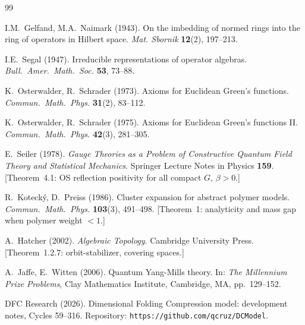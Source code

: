 \documentclass[11pt,a4paper]{article}
\begin{document}
\begin{thebibliography}{99}

I.M.~Gelfand, M.A.~Naimark (1943).
On the imbedding of normed rings into the ring of operators in Hilbert space.
\textit{Mat. Sbornik} \textbf{12}(2), 197--213.

I.E.~Segal (1947).
Irreducible representations of operator algebras.
\textit{Bull.\ Amer.\ Math.\ Soc.} \textbf{53}, 73--88.

K.~Osterwalder, R.~Schrader (1973).
Axioms for Euclidean Green's functions.
\textit{Commun.\ Math.\ Phys.} \textbf{31}(2), 83--112.

K.~Osterwalder, R.~Schrader (1975).
Axioms for Euclidean Green's functions II.
\textit{Commun.\ Math.\ Phys.} \textbf{42}(3), 281--305.

E.~Seiler (1978).
\textit{Gauge Theories as a Problem of Constructive Quantum Field Theory
and Statistical Mechanics}.
Springer Lecture Notes in Physics \textbf{159}.
[Theorem~4.1: OS reflection positivity for all compact $G$, $\beta>0$.]

R.~Koteck\'{y}, D.~Preiss (1986).
Cluster expansion for abstract polymer models.
\textit{Commun.\ Math.\ Phys.} \textbf{103}(3), 491--498.
[Theorem~1: analyticity and mass gap when polymer weight $< 1$.]

A.~Hatcher (2002).
\textit{Algebraic Topology}.
Cambridge University Press.
[Theorem~1.2.7: orbit-stabilizer, covering spaces.]

A.~Jaffe, E.~Witten (2006).
Quantum Yang-Mills theory.
In: \textit{The Millennium Prize Problems},
Clay Mathematics Institute, Cambridge, MA, pp.~129--152.

DFC Research (2026).
Dimensional Folding Compression model: development notes, Cycles 59--316.
Repository: \texttt{https://github.com/qcruz/DCModel}.

\end{thebibliography}
\end{document}
